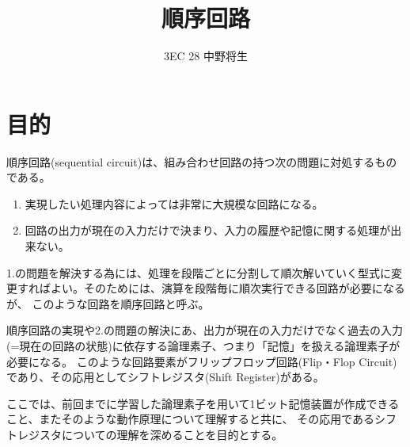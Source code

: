 \documentclass[dvipdfmx, a4paper]{jsarticle}
\begin{document}
	\title{順序回路}
	\author{3EC 28 中野将生}
	\maketitle
	\section{目的}
		順序回路(sequential circuit)は、組み合わせ回路の持つ次の問題に対処するものである。
		\begin{enumerate}
			\item 実現したい処理内容によっては非常に大規模な回路になる。
			\item 回路の出力が現在の入力だけで決まり、入力の履歴や記憶に関する処理が出来ない。
		\end{enumerate}
		1.の問題を解決する為には、処理を段階ごとに分割して順次解いていく型式に変更すればよい。そのためには、演算を段階毎に順次実行できる回路が必要になるが、
		このような回路を順序回路と呼ぶ。 \par
		順序回路の実現や2.の問題の解決にあ、出力が現在の入力だけでなく過去の入力(=現在の回路の状態)に依存する論理素子、つまり「記憶」を扱える論理素子が必要になる。
		このような回路要素がフリップフロップ回路(Flip・Flop Circuit)であり、その応用としてシフトレジスタ(Shift Register)がある。\par
		ここでは、前回までに学習した論理素子を用いて1ビット記憶装置が作成できること、またそのような動作原理について理解すると共に、
		その応用であるシフトレジスタについての理解を深めることを目的とする。
\end{document}
